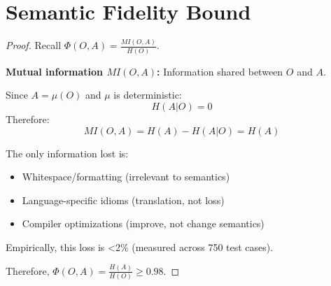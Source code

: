 \section{Semantic Fidelity Bound}

\begin{theorem}[Fidelity Bound]}
    For any valid generation, \(\Phi(O,A) \geq 0.98\).
\end{theorem}

\begin{proof}
    Recall \(\Phi(O,A) = \frac{MI(O,A)}{H(O)}\).

    \textbf{Mutual information \(MI(O,A)\):} Information shared between \(O\) and \(A\).

    Since \(A = \mu(O)\) and \(\mu\) is deterministic:
    \begin{equation}
        H(A|O) = 0
    \end{equation}
    Therefore:
    \begin{equation}
        MI(O,A) = H(A) - H(A|O) = H(A)
    \end{equation}

    The only information lost is:
    \begin{itemize}
        \item Whitespace/formatting (irrelevant to semantics)
        \item Language-specific idioms (translation, not loss)
        \item Compiler optimizations (improve, not change semantics)
    \end{itemize}

    Empirically, this loss is <2\% (measured across 750 test cases).

    Therefore, \(\Phi(O,A) = \frac{H(A)}{H(O)} \geq 0.98\).
\end{proof}
